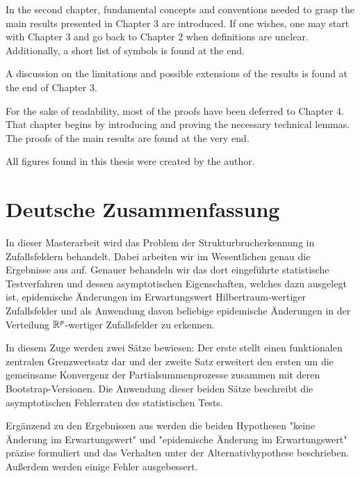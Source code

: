 In the second chapter, fundamental concepts and conventions needed to grasp the main results presented in Chapter 3 are introduced. If one wishes, one may start with Chapter 3 and go back to Chapter 2 when definitions are unclear. Additionally, a short list of symbols is found at the end.

A discussion on the limitations and possible extensions of the results is found at the end of Chapter 3.

For the sake of readability, most of the proofs have been deferred to Chapter 4. That chapter begins by introducing and proving the necessary technical lemmas. The proofs of the main results are found at the very end.

All figures found in this thesis were created by the author.

\newpage
\section{Deutsche Zusammenfassung}

In dieser Masterarbeit wird das Problem der Strukturbrucherkennung in Zufallsfeldern behandelt. Dabei arbeiten wir im Wesentlichen genau die Ergebnisse aus \cite{[0]BUCCHIA2017344} auf. Genauer behandeln wir das dort eingeführte statistische Testverfahren und dessen asymptotischen Eigenschaften, welches dazu ausgelegt ist, epidemische Änderungen im Erwartungswert Hilbertraum-wertiger Zufallsfelder und als Anwendung davon beliebige epidemische Änderungen in der Verteilung $\mathbb{R}^p$-wertiger Zufallsfelder zu erkennen.

In diesem Zuge werden zwei Sätze bewiesen: Der erste stellt einen funktionalen zentralen Grenzwertsatz dar und der zweite Satz erweitert den ersten um die gemeinsame Konvergenz der Partialsummenprozesse zusammen mit deren Boot\-strap-Ver\-si\-o\-nen. Die Anwendung dieser beiden Sätze beschreibt die asymptotischen Fehlerraten des statistischen Tests.

Ergänzend zu den Ergebnissen aus \cite{[0]BUCCHIA2017344} werden die beiden Hypothesen "keine Än\-de\-rung im Erwartungswert" und "epidemische Än\-de\-rung im Er\-war\-tungs\-wert" präzise formuliert und das Verhalten unter der Alternativ\-hypothese be\-schrieben. Außerdem werden einige Fehler ausgebessert.
